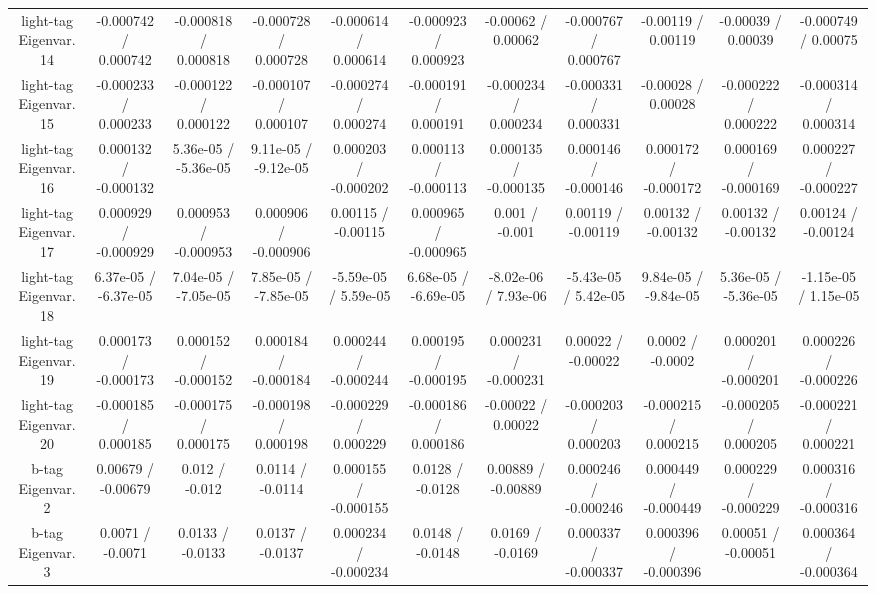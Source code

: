 \begin{table}[htbp]
\begin{center}
\begin{tabular}{|c|c|c|c|c|c|c|c|c|c|c|}
  light-tag Eigenvar. 14 & -0.000742 / 0.000742 & -0.000818 / 0.000818 & -0.000728 / 0.000728 & -0.000614 / 0.000614 & -0.000923 / 0.000923 & -0.00062 / 0.00062 & -0.000767 / 0.000767 & -0.00119 / 0.00119 & -0.00039 / 0.00039 & -0.000749 / 0.00075 \\ 
  light-tag Eigenvar. 15 & -0.000233 / 0.000233 & -0.000122 / 0.000122 & -0.000107 / 0.000107 & -0.000274 / 0.000274 & -0.000191 / 0.000191 & -0.000234 / 0.000234 & -0.000331 / 0.000331 & -0.00028 / 0.00028 & -0.000222 / 0.000222 & -0.000314 / 0.000314 \\ 
  light-tag Eigenvar. 16 & 0.000132 / -0.000132 & 5.36e-05 / -5.36e-05 & 9.11e-05 / -9.12e-05 & 0.000203 / -0.000202 & 0.000113 / -0.000113 & 0.000135 / -0.000135 & 0.000146 / -0.000146 & 0.000172 / -0.000172 & 0.000169 / -0.000169 & 0.000227 / -0.000227 \\ 
  light-tag Eigenvar. 17 & 0.000929 / -0.000929 & 0.000953 / -0.000953 & 0.000906 / -0.000906 & 0.00115 / -0.00115 & 0.000965 / -0.000965 & 0.001 / -0.001 & 0.00119 / -0.00119 & 0.00132 / -0.00132 & 0.00132 / -0.00132 & 0.00124 / -0.00124 \\ 
  light-tag Eigenvar. 18 & 6.37e-05 / -6.37e-05 & 7.04e-05 / -7.05e-05 & 7.85e-05 / -7.85e-05 & -5.59e-05 / 5.59e-05 & 6.68e-05 / -6.69e-05 & -8.02e-06 / 7.93e-06 & -5.43e-05 / 5.42e-05 & 9.84e-05 / -9.84e-05 & 5.36e-05 / -5.36e-05 & -1.15e-05 / 1.15e-05 \\ 
  light-tag Eigenvar. 19 & 0.000173 / -0.000173 & 0.000152 / -0.000152 & 0.000184 / -0.000184 & 0.000244 / -0.000244 & 0.000195 / -0.000195 & 0.000231 / -0.000231 & 0.00022 / -0.00022 & 0.0002 / -0.0002 & 0.000201 / -0.000201 & 0.000226 / -0.000226 \\ 
  light-tag Eigenvar. 20 & -0.000185 / 0.000185 & -0.000175 / 0.000175 & -0.000198 / 0.000198 & -0.000229 / 0.000229 & -0.000186 / 0.000186 & -0.00022 / 0.00022 & -0.000203 / 0.000203 & -0.000215 / 0.000215 & -0.000205 / 0.000205 & -0.000221 / 0.000221 \\ 
  b-tag Eigenvar. 2 & 0.00679 / -0.00679 & 0.012 / -0.012 & 0.0114 / -0.0114 & 0.000155 / -0.000155 & 0.0128 / -0.0128 & 0.00889 / -0.00889 & 0.000246 / -0.000246 & 0.000449 / -0.000449 & 0.000229 / -0.000229 & 0.000316 / -0.000316 \\ 
  b-tag Eigenvar. 3 & 0.0071 / -0.0071 & 0.0133 / -0.0133 & 0.0137 / -0.0137 & 0.000234 / -0.000234 & 0.0148 / -0.0148 & 0.0169 / -0.0169 & 0.000337 / -0.000337 & 0.000396 / -0.000396 & 0.00051 / -0.00051 & 0.000364 / -0.000364 \\ 

\end{tabular}
\end{center}
\end{table}
